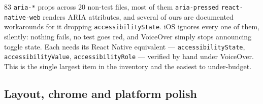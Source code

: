 \documentclass[11pt]{article}
\newcommand{\code}[1]{\texttt{\small #1}}
\newcommand{\bk}{\discretionary{}{}{}}
\newenvironment{findings}
  {\begin{description}[style=nextline,leftmargin=1.1em,labelindent=0pt,
     itemsep=1.05em,parsep=0.3em,topsep=0.6em,font=\normalfont\color{ink}\bfseries]}
  {\end{description}}
\begin{document}
\begin{findings}

\item[83 \code{aria-*} props across 20 non-test files, most of them \code{aria-pressed}]
\code{react-native-web} renders ARIA attributes, and several of ours are documented workarounds for
it dropping \code{accessibilityState}. iOS ignores every one of them, silently: nothing fails, no
test goes red, and VoiceOver simply stops announcing toggle state. Each needs its React Native
equivalent --- \code{accessibilityState}, \code{accessibility\bk Value}, \code{accessibilityRole} ---
verified by hand under VoiceOver. This is the single largest item in the inventory and the easiest to
under-budget.

\end{findings}

\subsection{Layout, chrome and platform polish}
\end{document}
